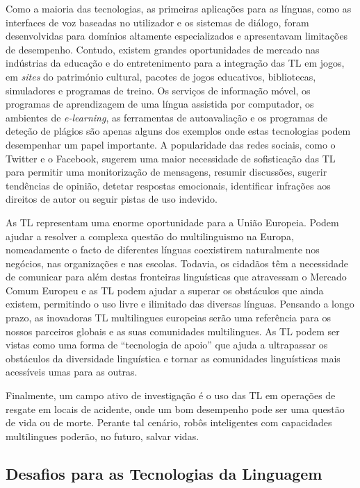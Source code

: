 \begin{multicols}{2}
Como a maioria das tecnologias, as primeiras aplicações para as línguas, como as interfaces de voz baseadas no utilizador e os sistemas de diálogo, foram desenvolvidas para domínios altamente especializados e apresentavam limitações de desempenho. Contudo, existem grandes oportunidades de mercado nas indústrias da educação e do entretenimento para a integração das TL em jogos, em \textit{sites} do património cultural, pacotes de jogos e\-du\-ca\-ti\-vos, bibliotecas, simuladores e programas de treino. Os serviços de informação móvel, os programas de aprendizagem de uma língua assistida por computador, os ambientes de \textit{e-learning}, as ferramentas de autoavaliação e os programas de deteção de plágios são apenas alguns dos exemplos onde estas tecnologias podem desempenhar um papel importante. A popularidade das redes sociais, como o Twitter e o Facebook, sugerem uma maior necessidade de sofisticação das TL para permitir uma monitorização de mensagens, resumir discussões, sugerir tendências de opinião, detetar respostas emocionais, identificar infrações aos direitos de autor ou seguir pistas de uso indevido.


As TL representam uma enorme oportunidade para a União Europeia. Podem ajudar a resolver a complexa questão do multilinguismo na Europa, nomeadamente o facto de diferentes línguas coexistirem naturalmente nos negócios, nas organizações e nas escolas. Todavia, os cidadãos têm a necessidade de comunicar para além destas fronteiras linguísticas que atravessam o Mercado Comum Europeu e as TL podem ajudar a superar os obstáculos que ainda existem, permitindo o uso livre e ilimitado das diversas línguas. Pensando a longo prazo, as inovadoras TL multilingues europeias serão uma referência para os nossos parceiros globais e as suas comunidades multilingues. As TL podem ser vistas como uma forma de “tecnologia de apoio” que ajuda a ultrapassar os obstáculos da diversidade linguística e tornar as comunidades linguísticas mais acessíveis umas para as outras.

Finalmente, um campo ativo de investigação é o uso das TL em operações de resgate em locais de acidente, onde um bom desempenho pode ser uma questão de vida ou de morte. Perante tal cenário, robôs inteligentes com capacidades multilingues poderão, no futuro, salvar vidas.

\subsection{Desafios para as Tecnologias da Linguagem}


\end{multicols}
